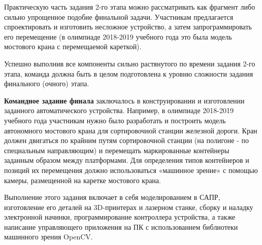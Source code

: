 Практическую часть задания 2-го этапа можно рассматривать как фрагмент либо сильно упрощенное подобие финальной задачи. Участникам предлагается спроектировать и изготовить несложное устройство, а затем запрограммировать его перемещение (в олимпиаде 2018-2019 учебного года это была модель мостового крана с перемещаемой кареткой).

Успешно выполнив все компоненты сильно растянутого по времени задания 2-го этапа, команда должна быть в целом подготовлена к уровню сложности задания финального (очного) этапа.

\textbf{Командное задание финала} заключалось в конструировании и изготовлении заданного автоматического устройства. Например, в олимпиаде 2018-2019 учебного года участникам нужно было разработать и построить модель автономного мостового крана для сортировочной станции железной дороги. Кран должен двигаться по крайним путям сортировочной станции (на полигоне - по специальным направляющим) и перемещать маркированные контейнеры заданным образом между платформами. Для определения типов контейнеров и позиций их перемещения должно использоваться «машинное зрение» с помощью камеры, размещенной на каретке мостового крана.

Выполнение этого задания включает в себя моделированием в САПР, изготовление его деталей на 3D-принтерах и лазерном станке, сборку и наладку электронной начинки, программирование контроллера устройства, а также написание управляющего приложения на ПК с использованием библиотеки машинного зрения OpenCV.
